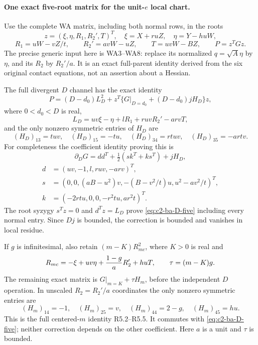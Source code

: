 \paragraph{One exact five-root matrix for the unit-$e$ local chart.}
Use the complete WA matrix, including both normal rows, in the roots
\[
 z=(\xi,\eta,R_1,R_2',T)^T,
 \quad \xi=X+ruZ,\quad\eta=Y-huW,
\]
\[
 R_1=uW-vZ/t,\qquad R_2'=avW-uZ,\qquad T=uvW-BZ,
 \qquad P=z^TGz.
\]
The precise generic input here is WA3--WA8: replace its normalized
$q=\sqrt A\eta$ by $\eta$, and its $R_2$ by $R_2'/a$.
It is an exact full-parent identity derived from the six original
contact equations, not an assertion about a Hessian.

The full divergent $D$ channel has the exact identity
\begin{equation}
 P=(D-d_0)L_D^2+
 z^T\{G|_{D=d_0}+(D-d_0)jH_D\}z,
 \label{eq:c2-ba-D-five}
\end{equation}
where $0<d_0<D$ is real,
\[
 L_D=uv\xi-\eta+lR_1+ruvR_2'-arvT,
\]
and the only nonzero symmetric entries of $H_D$ are
\[
 (H_D)_{13}=tuv,\quad (H_D)_{15}=-tu,\quad
 (H_D)_{34}=rtuv,\quad (H_D)_{35}=-artv.
\]
For completeness the coefficient identity proving this is
\[
 \partial_DG=dd^T+\tfrac12(sk^T+ks^T)+jH_D,
\]
\[
 \begin{aligned}
 d&=(uv,-1,l,ruv,-arv)^T,\\
 s&=(0,0,(aB-u^2)v,-(B-v^2/t)u,u^2-av^2/t)^T,\\
 k&=(-2rtu,0,0,-r^2tu,ar^2t)^T.
 \end{aligned}
\]
The root syzygy $s^Tz=0$ and $d^Tz=L_D$ prove
\eqref{eq:c2-ba-D-five} including every normal entry. Since $Dj$ is
bounded, the correction is bounded and vanishes in local residue.

If $g$ is infinitesimal, also retain $(m-K)R_{mc}^2$, where $K>0$ is
real and
\[
 R_{mc}=-\xi+uv\eta+{1-g\over a}R_2'+huT,
 \qquad \tau=(m-K)g.
\]
The remaining exact matrix is $G|_{m=K}+\tau H_m$, before the
independent $D$ operation. In unscaled $R_2=R_2'/a$ coordinates the
only nonzero symmetric entries are
\[
 (H_m)_{14}=-1,\quad (H_m)_{25}=v,\quad
 (H_m)_{44}=2-g,\quad(H_m)_{45}=hu.
\]
This is the full centered-$m$ identity R5.2--R5.5. It commutes with
\eqref{eq:c2-ba-D-five}; neither correction depends on the other
coefficient. Here $a$ is a unit and $\tau$ is bounded.

